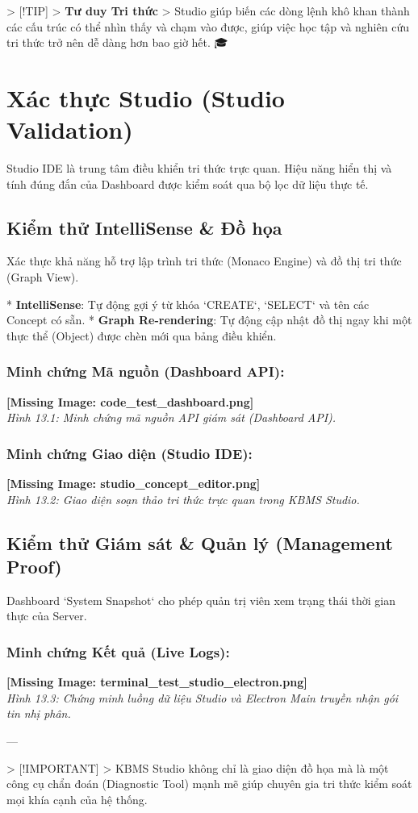 > [!TIP]
> \textbf{Tư duy Tri thức}
> Studio giúp biến các dòng lệnh khô khan thành các cấu trúc có thể nhìn thấy và chạm vào được, giúp việc học tập và nghiên cứu tri thức trở nên dễ dàng hơn bao giờ hết. 🎓

\section{Xác thực Studio (Studio Validation)}

Studio IDE là trung tâm điều khiển tri thức trực quan. Hiệu năng hiển thị và tính đúng đắn của Dashboard được kiểm soát qua bộ lọc dữ liệu thực tế.

\subsection{Kiểm thử IntelliSense & Đồ họa}

Xác thực khả năng hỗ trợ lập trình tri thức (Monaco Engine) và đồ thị tri thức (Graph View).

*   \textbf{IntelliSense}: Tự động gợi ý từ khóa `CREATE`, `SELECT` và tên các Concept có sẵn.
*   \textbf{Graph Re-rendering}: Tự động cập nhật đồ thị ngay khi một thực thể (Object) được chèn mới qua bảng điều khiển.

\subsubsection{Minh chứng Mã nguồn (Dashboard API):}
\textbf{[Missing Image: code_test_dashboard.png]}\\ \textit{Hình 13.1: Minh chứng mã nguồn API giám sát (Dashboard API).}

\subsubsection{Minh chứng Giao diện (Studio IDE):}
\textbf{[Missing Image: studio_concept_editor.png]}\\ \textit{Hình 13.2: Giao diện soạn thảo tri thức trực quan trong KBMS Studio.}

\subsection{Kiểm thử Giám sát & Quản lý (Management Proof)}

 Dashboard `System Snapshot` cho phép quản trị viên xem trạng thái thời gian thực của Server.

\subsubsection{Minh chứng Kết quả (Live Logs):}
\textbf{[Missing Image: terminal_test_studio_electron.png]}\\ \textit{Hình 13.3: Chứng minh luồng dữ liệu Studio và Electron Main truyền nhận gói tin nhị phân.}

---

> [!IMPORTANT]
> KBMS Studio không chỉ là giao diện đồ họa mà là một công cụ chẩn đoán (Diagnostic Tool) mạnh mẽ giúp chuyên gia tri thức kiểm soát mọi khía cạnh của hệ thống.


